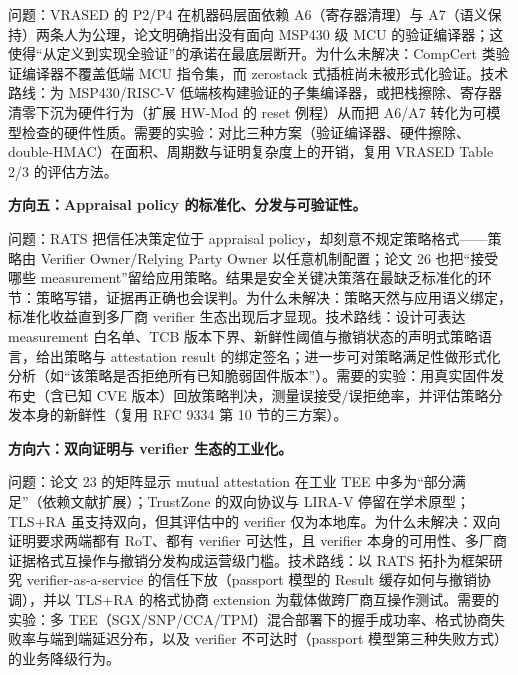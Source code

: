 \documentclass[11pt]{ctexart}
\begin{document}
问题：VRASED 的 P2/P4 在机器码层面依赖 A6（寄存器清理）与 A7（语义保持）两条人为公理，论文明确指出没有面向 MSP430 级 MCU 的验证编译器；这使得“从定义到实现全验证”的承诺在最底层断开。为什么未解决：CompCert 类验证编译器不覆盖低端 MCU 指令集，而 zerostack 式插桩尚未被形式化验证。技术路线：为 MSP430/RISC-V 低端核构建验证的子集编译器，或把栈擦除、寄存器清零下沉为硬件行为（扩展 HW-Mod 的 reset 例程）从而把 A6/A7 转化为可模型检查的硬件性质。需要的实验：对比三种方案（验证编译器、硬件擦除、double-HMAC）在面积、周期数与证明复杂度上的开销，复用 VRASED Table 2/3 的评估方法。\par
\noindent\textbf{方向五：Appraisal policy 的标准化、分发与可验证性。}\par
问题：RATS 把信任决策定位于 appraisal policy，却刻意不规定策略格式——策略由 Verifier Owner/Relying Party Owner 以任意机制配置；论文 26 也把“接受哪些 measurement”留给应用策略。结果是安全关键决策落在最缺乏标准化的环节：策略写错，证据再正确也会误判。为什么未解决：策略天然与应用语义绑定，标准化收益直到多厂商 verifier 生态出现后才显现。技术路线：设计可表达 measurement 白名单、TCB 版本下界、新鲜性阈值与撤销状态的声明式策略语言，给出策略与 attestation result 的绑定签名；进一步可对策略满足性做形式化分析（如“该策略是否拒绝所有已知脆弱固件版本”）。需要的实验：用真实固件发布史（含已知 CVE 版本）回放策略判决，测量误接受/误拒绝率，并评估策略分发本身的新鲜性（复用 RFC 9334 第 10 节的三方案）。\par
\noindent\textbf{方向六：双向证明与 verifier 生态的工业化。}\par
问题：论文 23 的矩阵显示 mutual attestation 在工业 TEE 中多为“部分满足”（依赖文献扩展）；TrustZone 的双向协议与 LIRA-V 停留在学术原型；TLS+RA 虽支持双向，但其评估中的 verifier 仅为本地库。为什么未解决：双向证明要求两端都有 RoT、都有 verifier 可达性，且 verifier 本身的可用性、多厂商证据格式互操作与撤销分发构成运营级门槛。技术路线：以 RATS 拓扑为框架研究 verifier-as-a-service 的信任下放（passport 模型的 Result 缓存如何与撤销协调），并以 TLS+RA 的格式协商 extension 为载体做跨厂商互操作测试。需要的实验：多 TEE（SGX/SNP/CCA/TPM）混合部署下的握手成功率、格式协商失败率与端到端延迟分布，以及 verifier 不可达时（passport 模型第三种失败方式）的业务降级行为。\par
\end{document}
